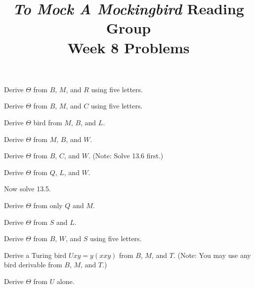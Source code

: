 \documentclass[12pt, letterpaper]{article}
\title{\emph{To Mock A Mockingbird} Reading Group\\Week 8 Problems}
\begin{document}
\maketitle
\setcounter{section}{13}

\disclaimer

\begin{prob}{13.1}   
Derive $\Theta$ from $B$, $M$, and $R$ using five letters.
\end{prob}

\begin{prob}{13.2}   
Derive $\Theta$ from $B$, $M$, and $C$ using five letters.
\end{prob}

\begin{prob}{13.3}   
Derive $\Theta$ bird from $M$, $B$, and $L$.
\end{prob}

\begin{prob}{13.4}   
Derive $\Theta$ from $M$, $B$, and $W$.
\end{prob}

\begin{prob}{13.5}   
Derive $\Theta$ from $B$, $C$, and $W$. (Note: Solve 13.6 first.)
\end{prob}

\begin{prob}{13.6}   
Derive $\Theta$ from $Q$, $L$, and $W$.
\end{prob}

\begin{prob}{13.7}   
Now solve 13.5.
\end{prob}

\begin{prob}{13.8}   
Derive $\Theta$ from only $Q$ and $M$.
\end{prob}

\begin{prob}{13.9}   
Derive $\Theta$ from $S$ and $L$.
\end{prob}

\begin{prob}{13.10}  
Derive $\Theta$ from $B$, $W$, and $S$ using five letters.
\end{prob}

\begin{prob}{13.11}  
Derive a Turing bird $Uxy = y(xxy)$ from $B$, $M$, and $T$. (Note: You may use any bird derivable from $B$, $M$, and $T$.)
\end{prob}

\begin{prob}{13.12}  
Derive $\Theta$ from $U$ alone.
\end{prob}
\end{document}

